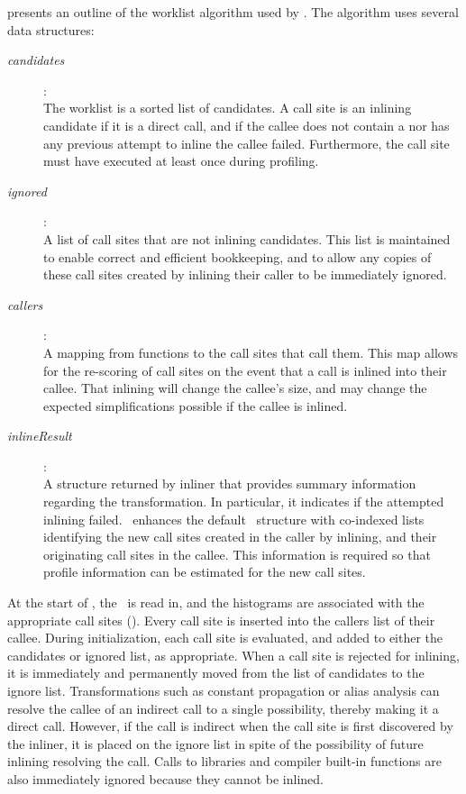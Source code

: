  presents an outline of the worklist
algorithm used by \FDI.  The algorithm uses several data structures:
\begin{description}

\item[{\it candidates}]: \\
  The worklist is a sorted list of candidates.
  A call site is an inlining candidate if it is a direct call, and if
  the callee does not contain a  nor has any previous
  attempt to inline the callee failed.  Furthermore, the call site
  must have executed at least once during profiling.

\item[{\it ignored}]: \\
  A list of call sites that are not inlining
  candidates.  This list is maintained to enable correct and efficient
  bookkeeping, and to allow any copies of these call sites created by
  inlining their caller to be immediately ignored.

\item[{\it callers}]: \\
  A mapping from functions to the call sites that
  call them.  This map allows for the re-scoring of call sites on the
  event that a call is inlined into their callee.  That inlining will
  change the callee's size, and may change the expected
  simplifications possible if the callee is inlined.

\item[{\it inlineResult}]: \\
  A structure returned by inliner that
  provides summary information regarding the transformation.  In
  particular, it indicates if the attempted inlining failed.
  \FDI\ enhances the default \llvm\ structure with co-indexed lists
  identifying the new call sites created in the caller by inlining,
  and their originating call sites in the callee.  This information is
  required so that profile information can be estimated for the new
  call sites.

\end{description}

At the start of \FDI, the \CProf\ is read in, and the histograms are
associated with the appropriate call sites ().  Every
call site is inserted into the callers list of their callee.  During
initialization, each call site is evaluated, and added to either the
candidates or ignored list, as appropriate.  When a call site is
rejected for inlining, it is immediately and permanently moved from
the list of candidates to the ignore list.  Transformations such as
constant propagation or alias analysis can resolve the callee of an
indirect call to a single possibility, thereby making it a direct
call.  However, if the call is indirect when the call site is first
discovered by the inliner, it is placed on the ignore list in spite of
the possibility of future inlining resolving the call.  Calls to
libraries and compiler built-in functions are also immediately ignored
because they cannot be inlined.

